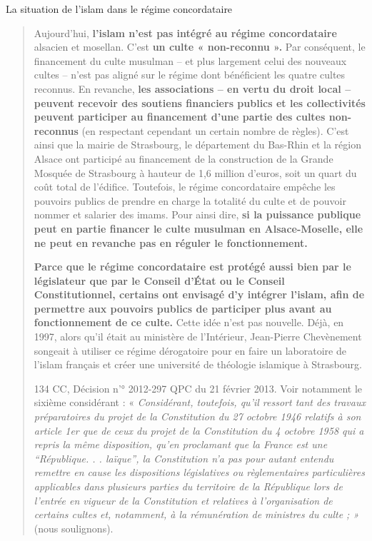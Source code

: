La situation de l'islam dans le régime concordataire

\begin{quote}
Aujourd'hui, \textbf{l'islam n'est pas intégré au régime concordataire}
alsacien et mosellan. C'est \textbf{un culte « non-reconnu ».} Par
conséquent, le financement du culte musulman -- et plus largement celui
des nouveaux cultes -- n'est pas aligné sur le régime dont bénéficient
les quatre cultes reconnus. En revanche, \textbf{les associations -- en
vertu du droit local -- peuvent recevoir des soutiens financiers publics
et les collectivités peuvent participer au financement d'une partie des
cultes non-reconnus} (en respectant cependant un certain nombre de
règles). C'est ainsi que la mairie de Strasbourg, le département du
Bas-Rhin et la région Alsace ont participé au financement de la
construction de la Grande Mosquée de Strasbourg à hauteur de 1,6 million
d'euros, soit un quart du coût total de l'édifice. Toutefois, le régime
concordataire empêche les pouvoirs publics de prendre en charge la
totalité du culte et de pouvoir nommer et salarier des imams. Pour ainsi
dire, \textbf{si la puissance publique peut en partie financer le culte
musulman en Alsace-Moselle, elle ne peut en revanche pas en réguler le
fonctionnement.}

\textbf{Parce que le régime concordataire est protégé aussi bien par le
législateur que par le Conseil d'État ou le Conseil Constitutionnel,
certains ont envisagé d'y intégrer l'islam, afin de permettre aux
pouvoirs publics de participer plus avant au fonctionnement de ce
culte.} Cette idée n'est pas nouvelle. Déjà, en 1997, alors qu'il était
au ministère de l'Intérieur, Jean-Pierre Chevènement songeait à utiliser
ce régime dérogatoire pour en faire un laboratoire de l'islam français
et créer une université de théologie islamique à Strasbourg.

134 CC, Décision n'° 2012-297 QPC du 21 février 2013. Voir notamment le
sixième considérant : « \emph{Considérant, toutefois, qu'il ressort tant
des travaux préparatoires du projet de la Constitution du 27 octobre
1946 relatifs à son article 1er que de ceux du projet de la Constitution
du 4 octobre 1958 qui a repris la même disposition, qu'en proclamant que
la France est une ``République. . . laïque'', la Constitution n'a pas
pour autant entendu remettre en cause les dispositions législatives ou
règlementaires particulières applicables dans plusieurs parties du
territoire de la République lors de l'entrée en vigueur de la
Constitution et relatives à l'organisation de certains cultes et,
notamment, à la rémunération de ministres du culte ; »} (nous
soulignons).


\end{quote}
